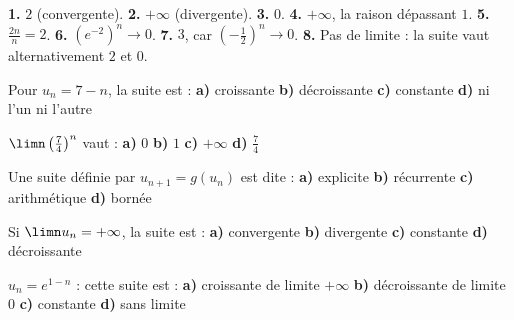 \begin{corrige}[limites]
\textbf{1.} $2$ (convergente).
\textbf{2.} $+\infty$ (divergente).
\textbf{3.} $0$.
\textbf{4.} $+\infty$, la raison dépassant $1$.
\textbf{5.} $\frac{2n}{n} = 2$.
\textbf{6.} $\left(e^{-2}\right)^{n} \to 0$.
\textbf{7.} $3$, car $\left(-\frac12\right)^{n} \to 0$.
\textbf{8.} Pas de limite : la suite vaut alternativement $2$ et $0$.
\end{corrige}

\begin{qcm}
\exo Pour $u_{n} = 7-n$, la suite est :
\textbf{a)} croissante \quad \textbf{b)} décroissante \quad
\textbf{c)} constante \quad \textbf{d)} ni l'un ni l'autre 

\exo $\limn \left(\frac74\right)^{n}$ vaut :
\textbf{a)} $0$ \quad \textbf{b)} $1$ \quad \textbf{c)} $+\infty$ \quad
\textbf{d)} $\frac74$ 

\exo Une suite définie par $u_{n+1} = g(u_{n})$ est dite :
\textbf{a)} explicite \quad \textbf{b)} récurrente \quad
\textbf{c)} arithmétique \quad \textbf{d)} bornée 

\exo Si $\limn u_{n} = +\infty$, la suite est :
\textbf{a)} convergente \quad \textbf{b)} divergente \quad
\textbf{c)} constante \quad \textbf{d)} décroissante 

\exo $u_{n} = e^{1-n}$ : cette suite est :
\textbf{a)} croissante de limite $+\infty$ \quad
\textbf{b)} décroissante de limite $0$ \quad
\textbf{c)} constante \quad \textbf{d)} sans limite 
\end{qcm}

